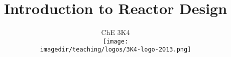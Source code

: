 \documentclass[handout, 14pt]{beamer}
\title[]{\large Introduction to Reactor Design}
\subtitle[]{\large ChE 3K4\\\vspace{0.5cm}\texttt{[image: \\imagedir/teaching/logos/3K4-logo-2013.png]}\vspace{-1.5cm} }
\author[]{}
\institute[]{}
\date[]{Kevin Dunn, \today \\ \vspace{1cm} {\footnotesize {\tt kevin.dunn@mcmaster.ca}\\
\href{http://learnche.mcmaster.ca/3K4}{http://learnche.mcmaster.ca/3K4}\\} \vspace{1cm}

{\footnotesize Overall revision number: \hgversion (\monthname~\THEYEAR)} %
}
\begin{document}
	
\begin{frame} \titlepage \end{frame}


\end{document}
